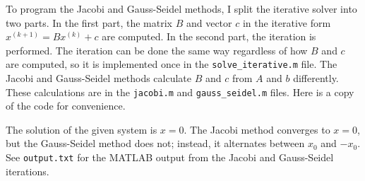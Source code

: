 \documentclass{homework}
\begin{document}
	\question
	To program the Jacobi and Gauss-Seidel methods, I split the iterative solver into two parts. In the first part, the matrix $B$ and vector $c$ in the iterative form $x^{(k+1)} = Bx^{(k)} + c$ are computed. In the second part, the iteration is performed. The iteration can be done the same way regardless of how $B$ and $c$ are computed, so it is implemented once in the \verb*|solve_iterative.m| file. The Jacobi and Gauss-Seidel methods calculate $B$ and $c$ from $A$ and $b$ differently. These calculations are in the \verb*|jacobi.m| and \verb*|gauss_seidel.m| files. Here is a copy of the code for convenience.
	
	
	
	
	
	
	The solution of the given system is $x = 0$. The Jacobi method converges to $x=0$, but the Gauss-Seidel method does not; instead, it alternates between $x_0$ and $-x_0$. See \verb*|output.txt| for the MATLAB output from the Jacobi and Gauss-Seidel iterations.
\end{document}
